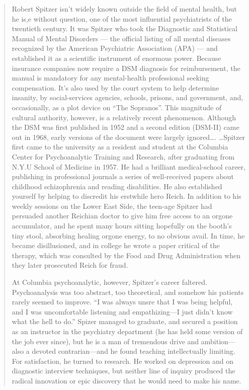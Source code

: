 \begin{quote}
Robert Spitzer isn't widely known outside the field of mental health, but he is,e without question, one of the most influential psychiatrists of the twentieth century. It was Spitzer who took the Diagnostic and Statistical Manual of Mental Disorders --- the official listing of all mental diseases recognized by the American Psychiatric Association (APA) --- and established it as a scientific instrument of enormous power. Because insurance companies now require a DSM diagnosis for reimbursement, the manual is mandatory for any mental-health professional seeking compensation. It's also used by the court system to help determine insanity, by social-services agencies, schools, prisons, and government, and, occasionally, as a plot device on ``The Sopranos''. This magnitude of cultural authority, however, is a relatively recent phenomenon. Although the DSM was first published in 1952 and a second edition (DSM-II) came out in 1968, early versions of the document were largely ignored{\ldots}.
{\ldots}Spitzer first came to the university as a resident and student at the Columbia Center for Psychoanalytic Training and Research, after graduating from N.Y.U School of Medicine in 1957. He had a brilliant medical-school career, publishing in professional journals a series of well-received papers about childhood schizophrenia and reading disabilities. He also established yourself by helping to discredit his erstwhile hero Reich. In addition to his weekly sessions on the Lower East Side, the teen-age Spitzer had persuaded another Reichian doctor to give him free access to an orgone accumulator, and he spent many hours sitting hopefully on the booth's tiny stool, absorbing healing orgone energy, to no obvious avail. In time, he became disillusioned, and in college he wrote a paper critical of the therapy, which was consulted by the Food and Drug Administration when they later prosecuted Reich for fraud.

At Columbia psychoanalytic, however, Spitzer's career faltered. Psychoanalysis was too abstract, too theoretical, and somehow his patients rarely seemed to improve. ``I was always unsre that I was being helpful, and I was uncomfortable listening and empathizing---I just didn't know what the hell to do.'' Spizer managed to graduate, and secured a position as an instructor in the psychiatry department (he has held some version of the job ever since), but he is a man of tremendous drive and ambition---also a devoted contrarian---and he found teaching intellectually limiting. For satisfaction, he turned to research. He worked on depression and on diagnostic interview techniques, but neither line of inquiry produced the radical innovation or epic discovery that he would need to make his name.


\end{quote}
